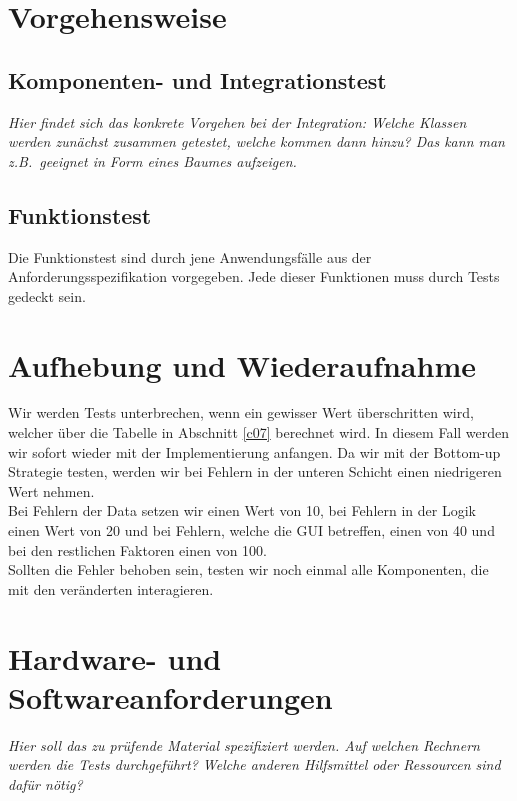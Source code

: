 \documentclass[fontsize=12pt,paper=a4,twoside]{scrartcl}
\newcommand{\highlight}[1]{\textcolor{blue}{\textbf{#1}}}
\newcommand{\nurlangversion}[0]{%
\ifthenelse{\boolean{langversion}}{\highlight{}}{\highlight{Entfällt in SWP-1}}}
\begin{document}
\section{Vorgehensweise}\label{c06}

\subsection{Komponenten- und Integrationstest}


{\em Hier findet sich das konkrete Vorgehen bei der Integration: Welche
  Klassen werden zunächst zusammen getestet, welche kommen dann hinzu?
 Das kann man z.B.\ geeignet in Form eines Baumes aufzeigen.}


\subsection{Funktionstest}

Die Funktionstest sind durch jene Anwendungsfälle aus der Anforderungsspezifikation vorgegeben. Jede dieser Funktionen muss durch Tests gedeckt sein.


\section{Aufhebung und Wiederaufnahme}\label{c08}

Wir werden Tests unterbrechen, wenn ein gewisser Wert überschritten wird, welcher über die Tabelle in Abschnitt  \ref{c07} berechnet wird. In diesem Fall werden wir sofort wieder mit der Implementierung anfangen. Da wir mit der Bottom-up Strategie testen, werden wir bei Fehlern in der unteren Schicht einen niedrigeren Wert nehmen.\\
Bei Fehlern der Data setzen wir einen Wert von 10, bei Fehlern in der Logik einen Wert von 20 und bei Fehlern, welche die GUI betreffen, einen von 40 und bei den restlichen Faktoren einen von 100.\\
Sollten die Fehler behoben sein, testen wir noch einmal alle Komponenten, die mit den veränderten interagieren.

\section{Hardware- und Softwareanforderungen}\label{c09}
\nurlangversion

{\em Hier soll das zu prüfende Material spezifiziert werden. Auf
  welchen Rechnern werden die Tests durchgeführt? Welche anderen
  Hilfsmittel oder Ressourcen sind dafür nötig?}
\end{document}
